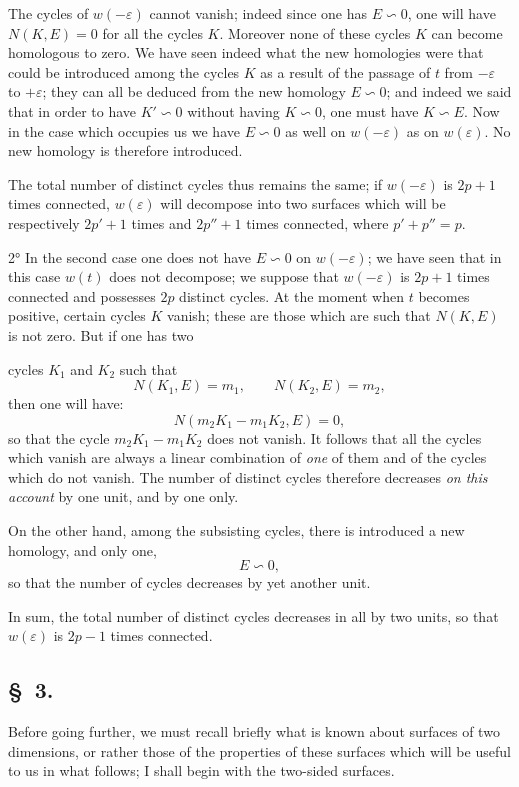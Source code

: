 \documentclass{article}
\begin{document}
The cycles of $w(-\varepsilon)$ cannot vanish; indeed since one has $E \backsim 0$, one will have $N(K, E) = 0$ for all the cycles $K$. Moreover none of these cycles $K$ can become homologous to zero. We have seen indeed what the new homologies were that could be introduced among the cycles $K$ as a result of the passage of $t$ from $-\varepsilon$ to $+\varepsilon$; they can all be deduced from the new homology $E \backsim 0$; and indeed we said that in order to have $K' \backsim 0$ without having $K \backsim 0$, one must have $K \backsim E$. Now in the case which occupies us we have $E \backsim 0$ as well on $w(-\varepsilon)$ as on $w(\varepsilon)$. No new homology is therefore introduced.

The total number of distinct cycles thus remains the same; if $w(-\varepsilon)$ is $2p + 1$ times connected, $w(\varepsilon)$ will decompose into two surfaces which will be respectively $2p' + 1$ times and $2p'' + 1$ times connected, where $p' + p'' = p$.

2° In the second case one does not have $E \backsim 0$ on $w(-\varepsilon)$; we have seen that in this case $w(t)$ does not decompose; we suppose that $w(-\varepsilon)$ is $2p + 1$ times connected and possesses $2p$ distinct cycles. At the moment when $t$ becomes positive, certain cycles $K$ vanish; these are those which are such that $N(K, E)$ is not zero. But if one has two

cycles $K_{1}$ and $K_{2}$ such that
\[ N(K_{1}, E) = m_{1}, \qquad N(K_{2}, E) = m_{2}, \]
then one will have:
\[ N(m_{2} K_{1} - m_{1} K_{2}, E) = 0, \]
so that the cycle $m_{2} K_{1} - m_{1} K_{2}$ does not vanish. It follows that all the cycles which vanish are always a linear combination of \emph{one} of them and of the cycles which do not vanish. The number of distinct cycles therefore decreases \emph{on this account} by one unit, and by one only.

On the other hand, among the subsisting cycles, there is introduced a new homology, and only one,
\[ E \backsim 0, \]
so that the number of cycles decreases by yet another unit.

In sum, the total number of distinct cycles decreases in all by two units, so that $w(\varepsilon)$ is $2p - 1$ times connected.

\subsection*{\S~3.}

Before going further, we must recall briefly what is known about surfaces of two dimensions, or rather those of the properties of these surfaces which will be useful to us in what follows; I shall begin with the two-sided surfaces.
\end{document}
